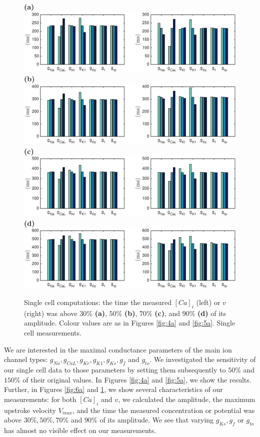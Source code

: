 \documentclass{article}
\begin{document}
\begin{figure}
 \textbf{(a)}  \includegraphics[trim=1cm 0cm 2cm 0cm, clip=true, width=1\linewidth]{sc_30p} 
 \textbf{(b)}  \includegraphics[trim=1cm 0cm 2cm 0cm, clip=true, width=1\linewidth]{sc_50p} 
 \textbf{(c)}   \includegraphics[trim=1cm 0cm 2cm 0cm, clip=true, width=1\linewidth]{sc_70p} 
  \textbf{(d)}   \includegraphics[trim=1cm 0cm 2cm 0cm, clip=true, width=1\linewidth]{sc_90p} 
    \caption{Single cell computations: the time the measured $[Ca]_i$ (left) or $v$ (right) was above $30\%$ \textbf{(a)}, $50\%$ \textbf{(b)}, $70\%$ \textbf{(c)}, and $90\%$ \textbf{(d)} of its amplitude. Colour values are as in Figures \ref{fig:4a} and \ref{fig:5a}. Single cell measurements.}
    \label{fig:7a}
\end{figure}
We are interested in the maximal conductance parameters of the main ion channel types: $g_{Na}, g_{CaL}, g_{Kr}, g_{K1}, g_{Ks}, g_{f}$ and $g_{to}$. We investigated the sensitivity of our single cell data to those parameters by setting them subsequently to $50\%$ and $150\%$ of their original values. In Figures \ref{fig:4a} and \ref{fig:5a}, we show the results. Further, in Figures \ref{fig:6a} and \ref{fig:7a}, we show several characteristics of our measurements: for both $[Ca]_i$ and $v$, we calculated the amplitude, the maximum upstroke velocity $V_{max}$, and the time the measured concentration or potential was above $30\%, 50\%, 70\%$ and $90\%$ of its amplitude. We see that varying $g_{Ks}, g_{f}$ or $g_{to}$ has almost no visible effect on our measurements.
%
\end{document}
